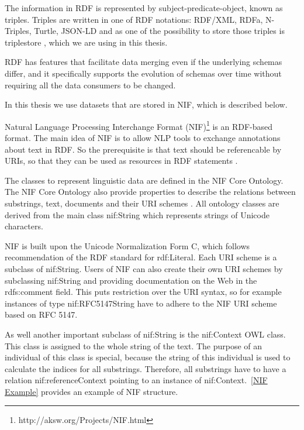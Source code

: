 \documentclass[thesis=M,english]{FITthesis}[2018/05/30]
\begin{document}
	The information in RDF is represented by subject-predicate-object, known as triples. Triples are written in one of RDF notations: RDF/XML, RDFa, N-Triples, Turtle, JSON-LD and as one of the possibility to store those triples is triplestore \cite{master:SPARQL}, which we are using in this thesis.
	
	RDF \cite{w3c:RDF} has features that facilitate data merging even if the underlying schemas differ, and it specifically supports the evolution of schemas over time without requiring all the data consumers to be changed.
	
	In this thesis we use datasets that are stored in NIF, which is described below. 
	
	Natural Language Processing Interchange Format (NIF)\footnote{http://aksw.org/Projects/NIF.html} \cite{w3c:NIF} is an RDF-based format. The main idea of NIF is to allow NLP tools to exchange annotations about text in RDF. So the prerequisite is that text should be referencable by URIs, so that they can be used as resources in RDF statements \cite{article:NIF}. 
	
	The classes to represent linguistic data are defined in the NIF Core Ontology. The NIF Core Ontology also provide  properties to describe the relations between substrings, text, documents and their URI schemes \cite{article:NIF}. All ontology classes are derived from the main class nif:String which represents strings of Unicode characters.
	
	NIF is built upon the Unicode Normalization Form C, which follows recommendation of the RDF standard for rdf:Literal. Each URI scheme is a subclass of nif:String. Users of NIF can also create their own URI schemes by subclassing nif:String and providing documentation on the Web in the rdfs:comment field. This puts restriction over the URI syntax, so for example instances of type nif:RFC5147String have to adhere to the NIF URI scheme based on RFC 5147.
	
	As well another important subclass of nif:String is the nif:Context OWL class. This class is assigned to the whole string of the text. The purpose of an individual of this class is special, because the string of this individual is used to calculate the indices for all substrings. Therefore, all substrings have to have a relation nif:referenceContext pointing to an instance of nif:Context.~\ref{NIF Example} provides an example of NIF structure.	
	
\end{document}
